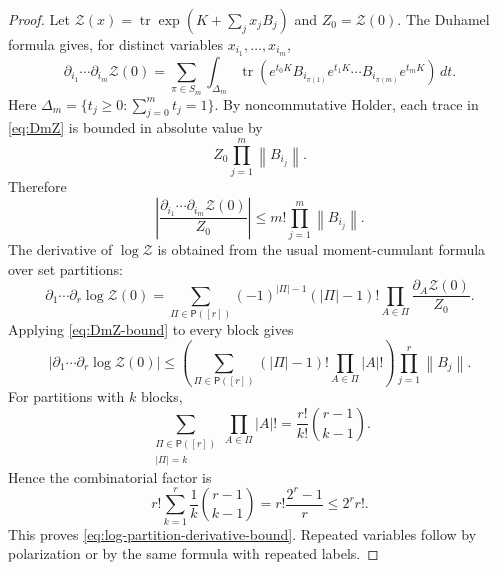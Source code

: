 \documentclass[11pt]{article}
\newcommand{\tr}{\operatorname{tr}}
\newcommand{\dd}{\,d}
\newcommand{\norm}[1]{\left\lVert #1\right\rVert}
\begin{document}
\begin{proof}
  Let $\mathcal Z(x)=\tr\exp(K+\sum_jx_jB_j)$ and $Z_0=\mathcal Z(0)$.  The
  Duhamel formula gives, for distinct variables $x_{i_1},\ldots,x_{i_m}$,
  \begin{equation}\label{eq:DmZ}
    \partial_{i_1}\cdots\partial_{i_m}\mathcal Z(0)
    =
    \sum_{\pi\in S_m}
    \int_{\Delta_m}
    \tr\left(
      e^{t_0K}B_{i_{\pi(1)}}e^{t_1K}\cdots
      B_{i_{\pi(m)}}e^{t_mK}
    \right)\dd t.
  \end{equation}
  Here $\Delta_m=\{t_j\geq0:\sum_{j=0}^m t_j=1\}$.  By noncommutative Holder,
  each trace in \eqref{eq:DmZ} is bounded in absolute value by
  \begin{equation}\label{eq:holder-bound-DmZ}
    Z_0\prod_{j=1}^m\norm{B_{i_j}}.
  \end{equation}
  Therefore
  \begin{equation}\label{eq:DmZ-bound}
    \left|
      \frac{\partial_{i_1}\cdots\partial_{i_m}\mathcal Z(0)}{Z_0}
    \right|
    \leq
    m!\prod_{j=1}^m\norm{B_{i_j}}.
  \end{equation}
  The derivative of $\log\mathcal Z$ is obtained from the usual moment-cumulant
  formula over set partitions:
  \begin{equation}\label{eq:partition-log-derivative}
    \partial_1\cdots\partial_r\log\mathcal Z(0)
    =
    \sum_{\Pi\in\mathsf P([r])}
    (-1)^{|\Pi|-1}(|\Pi|-1)!
    \prod_{A\in\Pi}
    \frac{\partial_A\mathcal Z(0)}{Z_0}.
  \end{equation}
  Applying \eqref{eq:DmZ-bound} to every block gives
  \begin{equation}\label{eq:partition-bound}
    \left|
      \partial_1\cdots\partial_r\log\mathcal Z(0)
    \right|
    \leq
    \left(
      \sum_{\Pi\in\mathsf P([r])}(|\Pi|-1)!\prod_{A\in\Pi}|A|!
    \right)
    \prod_{j=1}^r\norm{B_j}.
  \end{equation}
  For partitions with $k$ blocks,
  \begin{equation}\label{eq:block-factor-count}
    \sum_{\substack{\Pi\in\mathsf P([r])\\ |\Pi|=k}}
    \prod_{A\in\Pi}|A|!
    =
    \frac{r!}{k!}\binom{r-1}{k-1}.
  \end{equation}
  Hence the combinatorial factor is
  \begin{equation}\label{eq:partition-factor-explicit}
    r!\sum_{k=1}^r\frac1k\binom{r-1}{k-1}
    =
    r!\frac{2^r-1}{r}
    \leq
    2^rr!.
  \end{equation}
  This proves \eqref{eq:log-partition-derivative-bound}.  Repeated variables
  follow by polarization or by the same formula with repeated labels.
\end{proof}
\end{document}
